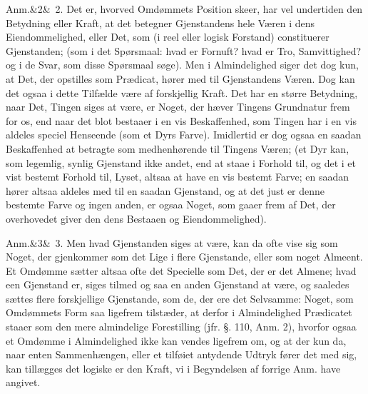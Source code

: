 \documentclass[12pt]{book}
\def\sperr#1{#1}%
\def\textit#1{#1}%
\def\emph#1{#1}%
\newcommand{\sperr}[1]{\textls[180]{#1}}
\newcommand{\anm}[1]{%
  \par\vspace{0.5\baselineskip}%
  \noindent\hspace{\parindent}\sperr{Anm.}\ifx&#1&\else~\textit{#1}.\fi
  \enspace\ignorespaces
}
\newcommand{\opage}[1]{\marginnote{\footnotesize\textit{[#1]}}}
\begin{document}
\anm{2} Det \emph{er}, hvorved Omdømmets Position skeer, har vel undertiden den
Betydning eller Kraft, at det betegner Gjenstandens hele
\opage{259} Væren i dens Eiendommelighed, eller Det, som (i reel eller logisk Forstand)
constituerer Gjenstanden; (som i det Spørsmaal: hvad er Fornuft? hvad er Tro,
Samvittighed? og i de Svar, som disse Spørsmaal søge). Men i Almindelighed siger
det dog kun, at Det, der opstilles som Prædicat, hører med til Gjenstandens
Væren. Dog kan det ogsaa i dette Tilfælde være af forskjellig Kraft. Det har en
større Betydning, naar Det, Tingen siges at være, er Noget, der hæver Tingens
Grundnatur frem for os, end naar det blot bestaaer i en vis Beskaffenhed, som
Tingen har i en vis aldeles speciel Henseende (som et Dyrs Farve). Imidlertid er
dog ogsaa en saadan Beskaffenhed at betragte som medhenhørende til Tingens
Væren; (et Dyr kan, som legemlig, synlig Gjenstand ikke andet, end at staae i
Forhold til, og det i et vist bestemt Forhold til, Lyset, altsaa at have en vis
bestemt Farve; en saadan hører altsaa aldeles med til en saadan Gjenstand, og at
det just er denne bestemte Farve og ingen anden, er ogsaa Noget, som gaaer frem
af Det, der overhovedet giver den dens Bestaaen og Eiendommelighed).

\anm{3} Men hvad Gjenstanden siges at være, kan da ofte vise sig som Noget, der
gjenkommer som det Lige i flere Gjenstande, eller som noget Almeent. Et Omdømme
sætter altsaa ofte det Specielle som Det, der er det Almene; hvad een Gjenstand
er, siges tilmed og%
\opage{260}saa en anden Gjenstand at være, og saaledes sættes flere forskjellige
Gjenstande, som de, der ere det Selvsamme: Noget, som Omdømmets Form saa
ligefrem tilstæder, at derfor i Almindelighed Prædicatet staaer som den mere
almindelige Forestilling (jfr. §. 110, Anm. 2), hvorfor ogsaa et Omdømme i
Almindelighed ikke kan vendes ligefrem om, og at der kun da, naar enten
Sammenhængen, eller et tilføiet antydende Udtryk fører det med sig, kan
tillægges det logiske \emph{er} den Kraft, vi i Begyndelsen af forrige Anm. have
angivet.
\end{document}

